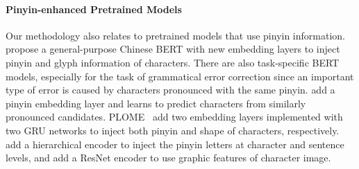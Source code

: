 

\paragraph{Pinyin-enhanced Pretrained Models}
Our methodology also relates to pretrained models that use pinyin information.
\citet{sun-etal-2021-chinesebert} propose a general-purpose Chinese BERT with new embedding layers to inject pinyin and glyph information of characters.
There are also task-specific BERT models, especially for the task of grammatical error correction since an important type of error is caused by characters pronounced with the same pinyin.
\citet{zhang-etal-2021-correcting} add a pinyin embedding layer and learns to predict characters from similarly pronounced candidates.
PLOME~\cite{liu-etal-2021-plome} add two embedding layers implemented with two GRU networks to inject both pinyin and shape of characters, respectively.
\citet{xu-etal-2021-read} add a hierarchical encoder to inject the pinyin letters at character and sentence levels, and add a ResNet encoder to use graphic features of character image.  

